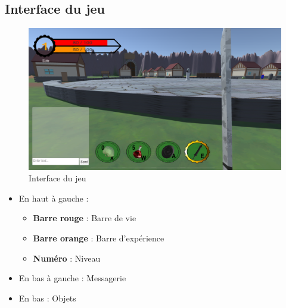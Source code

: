 \documentclass[a4paper, 11pt]{article}
\begin{document}
	\subsection{Interface du jeu}
	\begin{figure}[!ht]
		\centering
		\includegraphics[scale=0.3]{images/hud.png}
		\caption{Interface du jeu}
	\end{figure}
	\begin{itemize}
		\item En haut à gauche :
		\begin{itemize}
			\item \textbf{Barre rouge} : Barre de vie
			\item \textbf{Barre orange} : Barre d'expérience
			\item \textbf{Numéro} : Niveau
		\end{itemize}
		\item En bas à gauche : Messagerie
		\item En bas : Objets
	\end{itemize}
	
\end{document}
